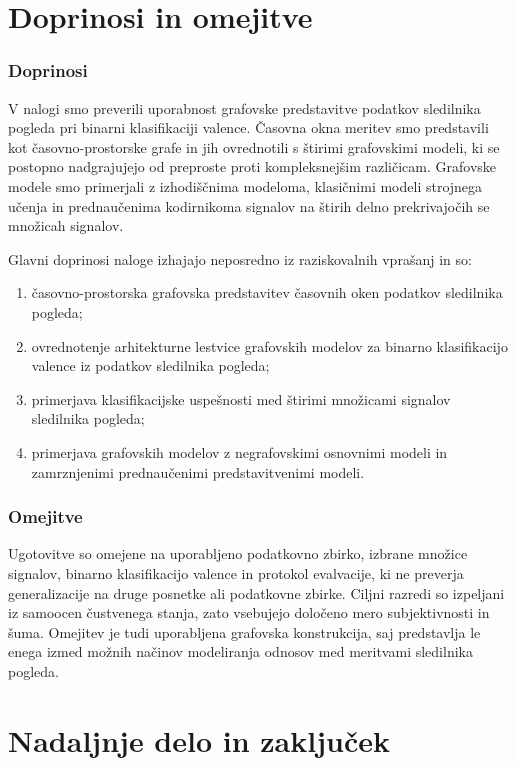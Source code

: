 \section{Doprinosi in omejitve}

\subsubsection*{Doprinosi}
V nalogi smo preverili uporabnost grafovske predstavitve podatkov sledilnika pogleda pri binarni klasifikaciji valence.
Časovna okna meritev smo predstavili kot časovno-prostorske grafe in jih ovrednotili s štirimi grafovskimi modeli, ki se postopno nadgrajujejo od preproste proti kompleksnejšim različicam.
Grafovske modele smo primerjali z izhodiščnima modeloma, klasičnimi modeli strojnega učenja in prednaučenima kodirnikoma signalov na štirih delno prekrivajočih se množicah signalov.

Glavni doprinosi naloge izhajajo neposredno iz raziskovalnih vprašanj in so:

\begin{enumerate}
    \item časovno-prostorska grafovska predstavitev časovnih oken podatkov sledilnika pogleda;
    \item ovrednotenje arhitekturne lestvice grafovskih modelov za binarno klasifikacijo valence iz podatkov sledilnika pogleda;
    \item primerjava klasifikacijske uspešnosti med štirimi množicami signalov sledilnika pogleda;
    \item primerjava grafovskih modelov z negrafovskimi osnovnimi modeli in zamrznjenimi prednaučenimi predstavitvenimi modeli.
\end{enumerate}

\subsubsection*{Omejitve}
Ugotovitve so omejene na uporabljeno podatkovno zbirko, izbrane množice signalov, binarno klasifikacijo valence in protokol evalvacije, ki ne preverja generalizacije na druge posnetke ali podatkovne zbirke.
Ciljni razredi so izpeljani iz samoocen čustvenega stanja, zato vsebujejo določeno mero subjektivnosti in šuma.
Omejitev je tudi uporabljena grafovska konstrukcija, saj predstavlja le enega izmed možnih načinov modeliranja odnosov med meritvami sledilnika pogleda.

\section{Nadaljnje delo in zaključek}


